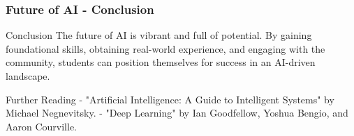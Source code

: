 \documentclass{beamer}
\begin{document}
\begin{frame}[fragile]
    \frametitle{Future of AI - Conclusion}
    \begin{block}{Conclusion}
        The future of AI is vibrant and full of potential. By gaining foundational skills, obtaining real-world experience, and engaging with the community, students can position themselves for success in an AI-driven landscape.
    \end{block}
    
    \begin{block}{Further Reading}
        - "Artificial Intelligence: A Guide to Intelligent Systems" by Michael Negnevitsky.
        - "Deep Learning" by Ian Goodfellow, Yoshua Bengio, and Aaron Courville.
    \end{block}
\end{frame}
\end{document}
